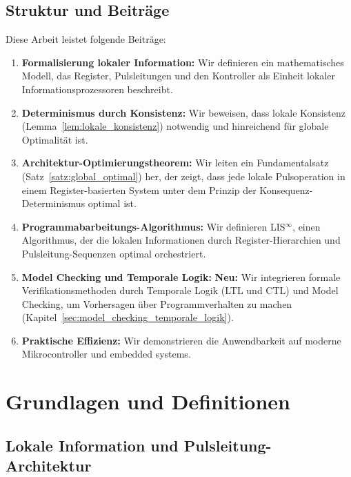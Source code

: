 \documentclass[a4paper,12pt]{article}
\theoremstyle{definition}
\begin{document}
	\subsection{Struktur und Beiträge}
	
	Diese Arbeit leistet folgende Beiträge:
	
	\begin{enumerate}
		\item \textbf{Formalisierung lokaler Information:} Wir definieren ein mathematisches Modell, das Register, Pulsleitungen und den Kontroller als Einheit lokaler Informationsprozessoren beschreibt.
		
		\item \textbf{Determinismus durch Konsistenz:} Wir beweisen, dass lokale Konsistenz (Lemma~\ref{lem:lokale_konsistenz}) notwendig und hinreichend für globale Optimalität ist.
		
		\item \textbf{Architektur-Optimierungstheorem:} Wir leiten ein Fundamentalsatz (Satz~\ref{satz:global_optimal}) her, der zeigt, dass jede lokale Pulsoperation in einem Register-basierten System unter dem Prinzip der Konsequenz-Determinismus optimal ist.
		
		\item \textbf{Programmabarbeitungs-Algorithmus:} Wir definieren LIS$^{\infty}$, einen Algorithmus, der die lokalen Informationen durch Register-Hierarchien und Pulsleitung-Sequenzen optimal orchestriert.
		
		\item \textbf{Model Checking und Temporale Logik:} \textbf{Neu:} Wir integrieren formale Verifikationsmethoden durch Temporale Logik (LTL und CTL) und Model Checking, um Vorhersagen über Programmverhalten zu machen (Kapitel~\ref{sec:model_checking_temporale_logik}).
		
		\item \textbf{Praktische Effizienz:} Wir demonstrieren die Anwendbarkeit auf moderne Mikrocontroller und embedded systems.
	\end{enumerate}
	
	\section{Grundlagen und Definitionen}
	\label{sec:grundlagen}
	
	\subsection{Lokale Information und Pulsleitung-Architektur}
	
\end{document}
